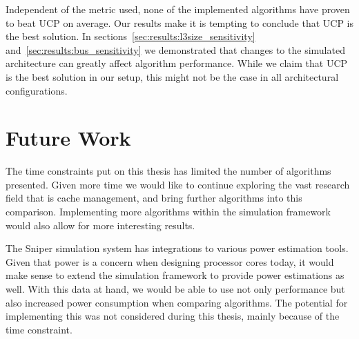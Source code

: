 Independent of the metric used, none of the implemented algorithms have proven to beat UCP on average.
Our results make it is tempting to conclude that UCP is the best solution.
In sections~\ref{sec:results:l3size_sensitivity} and~\ref{sec:results:bus_sensitivity} we demonstrated that changes to the simulated architecture can greatly affect algorithm performance.
While we claim that UCP is the best solution in our setup, this might not be the case in all architectural configurations.

\section{Future Work}

The time constraints put on this thesis has limited the number of algorithms presented.
Given more time we would like to continue exploring the vast research field that is cache management, and bring further algorithms into this comparison.
Implementing more algorithms within the simulation framework would also allow for more interesting results.

The Sniper simulation system has integrations to various power estimation tools.
Given that power is a concern when designing processor cores today, it would make sense to extend the simulation framework to provide power estimations as well.
With this data at hand, we would be able to use not only performance but also increased power consumption when comparing algorithms.
The potential for implementing this was not considered during this thesis, mainly because of the time constraint.
